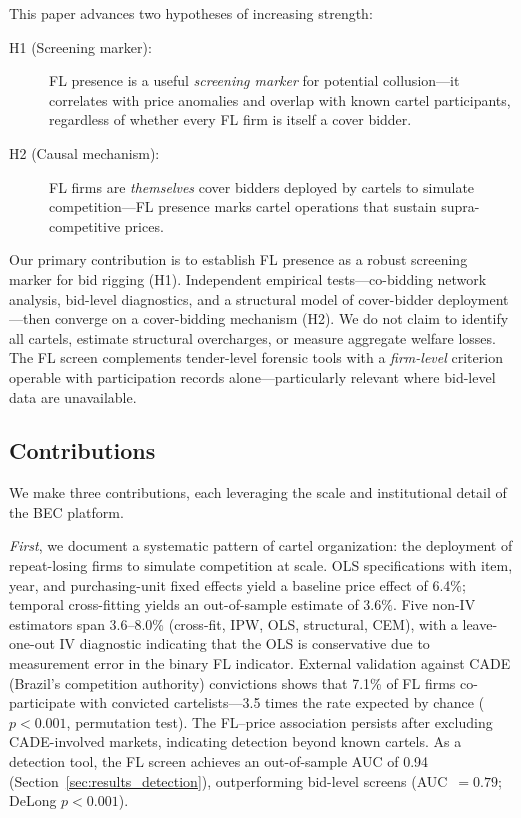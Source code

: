 This paper advances two hypotheses of increasing strength:

\begin{description}
  \item[H1 (Screening marker):] FL presence is a useful
    \emph{screening marker} for potential collusion---it correlates
    with price anomalies and overlap with known cartel participants,
    regardless of whether every FL firm is itself a cover bidder.
  \item[H2 (Causal mechanism):] FL firms are \emph{themselves} cover
    bidders deployed by cartels to simulate competition---FL presence
    marks cartel operations that sustain supra-competitive prices.
\end{description}

\noindent Our primary contribution is to establish FL presence as a
robust screening marker for bid rigging (H1). Independent empirical
tests---co-bidding network analysis, bid-level diagnostics, and a
structural model of cover-bidder deployment---then converge on a
cover-bidding mechanism (H2). We do not claim to identify all cartels,
estimate structural overcharges, or measure aggregate welfare losses.
The FL screen complements tender-level forensic tools
\citep{imhof2019detecting} with a \emph{firm-level} criterion operable
with participation records alone---particularly relevant where bid-level
data are unavailable.

\subsection{Contributions}

We make three contributions, each leveraging the scale and
institutional detail of the BEC platform.

\emph{First}, we document a systematic pattern of cartel organization:
the deployment of repeat-losing firms to simulate competition at scale.
OLS specifications with item, year, and purchasing-unit fixed effects
yield a baseline price effect of 6.4\%; temporal cross-fitting yields
an out-of-sample estimate of 3.6\%. Five non-IV estimators span
3.6--8.0\% (cross-fit, IPW, OLS, structural, CEM), with a
leave-one-out IV diagnostic indicating that the OLS is conservative
due to measurement error in the binary FL indicator. External validation against CADE (Brazil's
competition authority) convictions shows that 7.1\% of FL firms
co-participate with convicted cartelists---3.5 times the rate expected
by chance ($p < 0.001$, permutation test). The FL--price association
persists after excluding CADE-involved markets, indicating detection
beyond known cartels. As a detection tool, the FL screen achieves an
out-of-sample AUC of 0.94 (Section~\ref{sec:results_detection}),
outperforming bid-level screens (AUC~$= 0.79$; DeLong $p < 0.001$).

